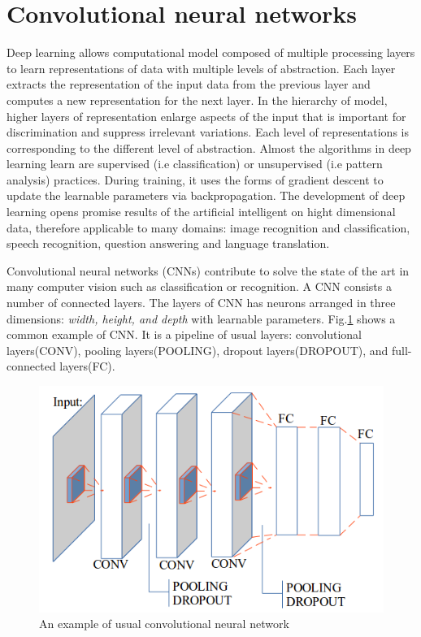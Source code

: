 \documentclass[conference]{IEEEtran}
\begin{document}
\section{Convolutional neural networks}
Deep learning allows computational model composed of multiple processing layers to learn representations of data with multiple levels of abstraction\cite{lecun2015deep}. Each layer extracts the representation of the input data from the previous layer and computes a new representation for the next layer. In the hierarchy of model, higher layers of representation enlarge aspects of the input that is important for discrimination and suppress irrelevant variations. Each level of representations is corresponding to the different level of abstraction. Almost the algorithms in deep learning learn are supervised (i.e classification) or unsupervised (i.e pattern analysis) practices. During training, it uses the forms of gradient descent to update the learnable parameters via backpropagation. The development of deep learning opens promise results of the artificial intelligent on hight dimensional data, therefore applicable to many domains: image recognition and classification\cite{krizhevsky2012imagenet,ciregan2012multi,szegedy2015going}, speech recognition\cite{mikolov2011strategies,hinton2012deep,sainath2013deep}, question answering\cite{bordes2014question} and language translation\cite{sutskever2014sequence}\cite{jean2014using}.

Convolutional neural networks (CNNs) contribute to solve the state of the art in many computer vision such as classification\cite{krizhevsky2012imagenet}\cite{ciregan2012multi} or recognition\cite{li2015convolutional}\cite{tompson2014joint}. A CNN consists a number of connected layers. The layers of CNN has neurons arranged in three dimensions: \textit{width, height, and depth} with learnable parameters. Fig.\ref{figconvarc} shows a common example of CNN. It is a pipeline of usual layers: convolutional layers(CONV), pooling layers(POOLING), dropout layers(DROPOUT), and full-connected layers(FC).
\begin{figure}[htbp]
	\centerline{\includegraphics[scale=0.45]{images/convarc}}
	\caption{An example of usual convolutional neural network}
	\label{figconvarc}
\end{figure}
\end{document}
